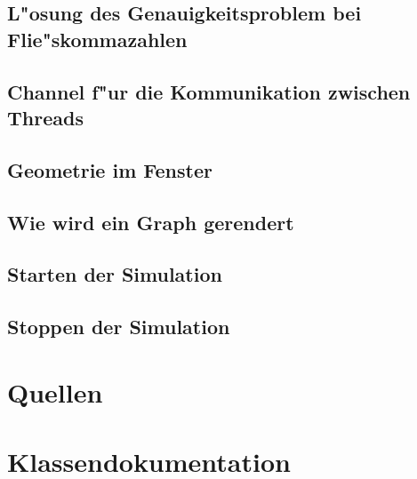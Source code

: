\documentclass[14pt, a4paper]{report}
\begin{document}
\section{L"osung des Genauigkeitsproblem bei Flie"skommazahlen}
\section{Channel f"ur die Kommunikation zwischen Threads}
\section{Geometrie im Fenster}
\section{Wie wird ein Graph gerendert}
\section{Starten der Simulation}
\section{Stoppen der Simulation}

\chapter{Quellen}

\appendix
\chapter{Klassendokumentation}
\newpage
\end{document}
